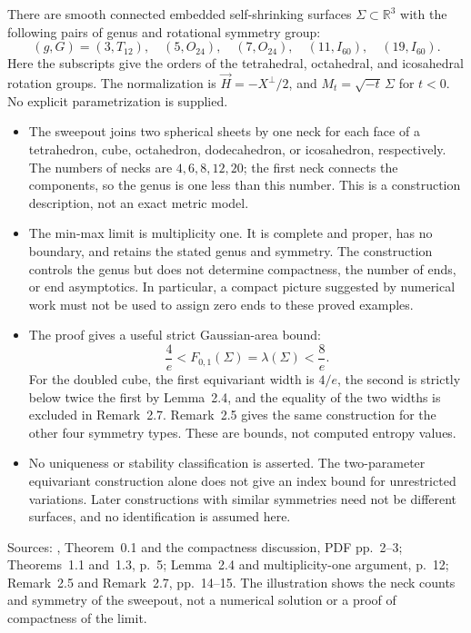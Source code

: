 \begin{example}\label{ex:catalogue-ketover-platonic}
There are smooth connected embedded self-shrinking surfaces
$\Sigma\subset\mathbb R^3$ with the following pairs of genus and
rotational symmetry group:
\[
 (g,G)=(3,T_{12}),\quad(5,O_{24}),\quad(7,O_{24}),
 \quad(11,I_{60}),\quad(19,I_{60}).
\]
Here the subscripts give the orders of the tetrahedral, octahedral,
and icosahedral rotation groups. The normalization is
$\vec H=-X^\perp/2$, and $M_t=\sqrt{-t}\,\Sigma$ for $t<0$.
No explicit parametrization is supplied.
\begin{itemize}
\item The sweepout joins two spherical sheets by one neck for each
face of a tetrahedron, cube, octahedron, dodecahedron, or icosahedron,
respectively. The numbers of necks are $4,6,8,12,20$; the first neck
connects the components, so the genus is one less than this number.
This is a construction description, not an exact metric model.
\item The min-max limit is multiplicity one. It is complete and proper,
has no boundary, and retains the stated genus and symmetry. The
construction controls the genus but does not determine compactness,
the number of ends, or end asymptotics. In particular, a compact
picture suggested by numerical work must not be used to assign zero
ends to these proved examples.
\item The proof gives a useful strict Gaussian-area bound:
\[
 \frac4e < F_{0,1}(\Sigma)=\lambda(\Sigma)<\frac8e.
\]
For the doubled cube, the first equivariant width is $4/e$, the
second is strictly below twice the first by Lemma~2.4, and the equality
of the two widths is excluded in Remark~2.7. Remark~2.5 gives the same
construction for the other four symmetry types. These are bounds,
not computed entropy values.
\item No uniqueness or stability classification is asserted. The
two-parameter equivariant construction alone does not give an index
bound for unrestricted variations. Later constructions with similar
symmetries need not be different surfaces, and no identification is
assumed here.
\end{itemize}
Sources: \cite{CatKetover2016}, Theorem~0.1 and the compactness
discussion, PDF pp.~2--3; Theorems~1.1 and~1.3, p.~5;
Lemma~2.4 and multiplicity-one argument, p.~12;
Remark~2.5 and Remark~2.7, pp.~14--15.
The illustration shows the neck counts and symmetry of the sweepout,
not a numerical solution or a proof of compactness of the limit.
\end{example}

